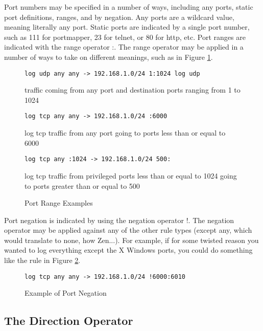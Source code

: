 \documentclass[english]{report}
\begin{document}
Port numbers may be specified in a number of ways, including any
ports, static port definitions, ranges, and by negation. Any
ports are a wildcard value, meaning literally any port. Static ports
are indicated by a single port number, such as 111 for portmapper,
23 for telnet, or 80 for http, etc. Port ranges are indicated with
the range operator :. The range operator may be
applied in a number of ways to take on different meanings, such as
in Figure \ref{port range examples}.

\begin{center}
\begin{figure}[!hbpt]
\begin{verbatim}
log udp any any -> 192.168.1.0/24 1:1024 log udp 
\end{verbatim}
traffic coming from any port and destination ports ranging from 1
to 1024

\begin{verbatim}
log tcp any any -> 192.168.1.0/24 :6000 
\end{verbatim}
log tcp traffic from any port going to ports less than or equal to
6000

\begin{verbatim}
log tcp any :1024 -> 192.168.1.0/24 500: 
\end{verbatim}
log tcp traffic from privileged ports less than or equal to 1024 going
to ports greater than or equal to 500


\caption{\label{port range examples}Port Range Examples}
\end{figure}
\end{center}

Port negation is indicated by using the negation operator !.
The negation operator may be applied against any of the other rule
types (except any, which would translate to none, how Zen...). For
example, if for some twisted reason you wanted to log everything except
the X Windows ports, you could do something like the rule in Figure
\ref{example port negation}.

%
\begin{figure}[!hbpt]
\begin{verbatim}
log tcp any any -> 192.168.1.0/24 !6000:6010
\end{verbatim}

\caption{\label{example port negation}Example of Port Negation}
\end{figure}

\clearpage

\subsection{The Direction Operator}
\end{document}
